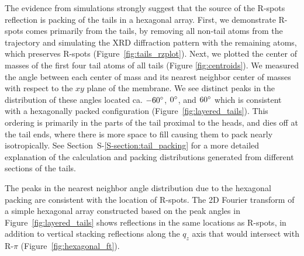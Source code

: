 \documentclass[journal=jpcbfk,manuscript=article]{achemso}
\begin{document}

  The evidence from simulations strongly suggest that the source of
  the R-spots reflection is packing of the tails in a hexagonal array.
  First, we demonstrate R-spots comes primarily from the tails, by
  removing all non-tail atoms from the trajectory and simulating the
  XRD diffraction pattern with the remaining atoms, which preserves
  R-spots (Figure~\ref{fig:tails_rzplot}).  Next, we plotted the center
  of masses of the first four tail atoms of all tails (Figure
  \ref{fig:centroids}). We measured the angle between each center of
  mass and its nearest neighbor center of masses with respect to the
  $xy$ plane of the membrane. We see distinct peaks in the
  distribution of these angles located ca. $-60\degree$, $0\degree$,
  and $60\degree$ which is consistent with a hexagonally packed
  configuration (Figure~\ref{fig:layered_tails}).  This ordering is
  primarily in the parts of the tail proximal to the heads, and dies
  off at the tail ends, where there is more space to fill causing them
  to pack nearly isotropically. See Section~S-\ref{S-section:tail_packing} for
  a more detailed explanation of the calculation and packing
  distributions generated from different sections of the tails.

  The peaks in the nearest neighbor angle distribution due to the hexagonal
  packing are consistent with the location of R-spots. The 2D Fourier transform
  of a simple hexagonal array constructed based on the peak angles in
  Figure~\ref{fig:layered_tails} shows reflections in the same locations as
  R-spots, in addition to vertical stacking reflections along the $q_z$ axis that
  would intersect with R-$\pi$ (Figure~\ref{fig:hexagonal_ft}). 
\end{document}
